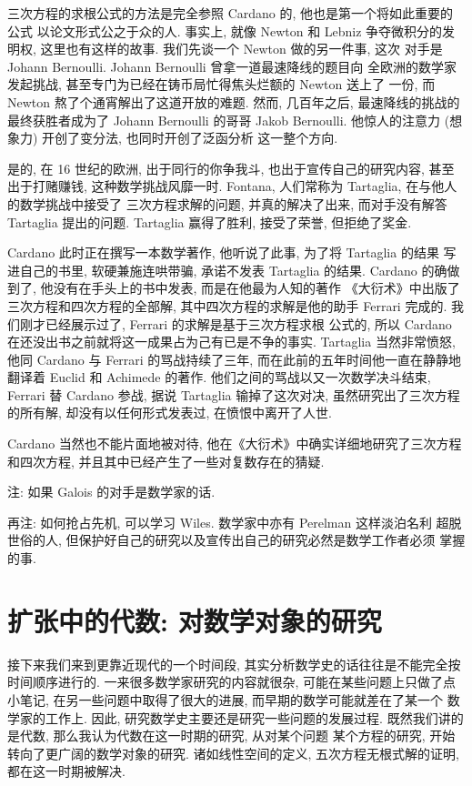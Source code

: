 \documentclass[UTF8]{book}
\begin{document}
三次方程的求根公式的方法是完全参照 Cardano 的, 他也是第一个将如此重要的公式
以论文形式公之于众的人. 事实上, 就像 Newton 和 Lebniz 争夺微积分的发明权, 
这里也有这样的故事. 
我们先谈一个 Newton 做的另一件事, 这次
对手是 Johann Bernoulli. Johann Bernoulli 曾拿一道最速降线的题目向
全欧洲的数学家发起挑战, 甚至专门为已经在铸币局忙得焦头烂额的 Newton 送上了
一份, 而 Newton 熬了个通宵解出了这道开放的难题. 
然而, 几百年之后, 最速降线的挑战的最终获胜者成为了 Johann Bernoulli 的哥哥 
Jakob Bernoulli. 他惊人的注意力 (想象力) 开创了变分法, 也同时开创了泛函分析
这一整个方向. 

是的, 在 16 世纪的欧洲, 出于同行的你争我斗, 也出于宣传自己的研究内容, 甚至
出于打赌赚钱, 这种数学挑战风靡一时. Fontana, 人们常称为 Tartaglia, 
在与他人的数学挑战中接受了
三次方程求解的问题, 并真的解决了出来, 而对手没有解答 Tartaglia 提出的问题. 
Tartaglia 赢得了胜利, 接受了荣誉, 但拒绝了奖金. 

Cardano 此时正在撰写一本数学著作, 他听说了此事, 为了将 Tartaglia 的结果
写进自己的书里, 软硬兼施连哄带骗, 承诺不发表 Tartaglia 的结果. 
Cardano 的确做到了, 他没有在手头上的书中发表, 而是在他最为人知的著作
《大衍术》中出版了三次方程和四次方程的全部解, 其中四次方程的求解是他的助手 
Ferrari 完成的. 我们刚才已经展示过了, Ferrari 的求解是基于三次方程求根
公式的, 所以 Cardano 在还没出书之前就将这一成果占为己有已是不争的事实. 
Tartaglia 当然非常愤怒, 他同 Cardano 与 Ferrari 的骂战持续了三年, 
而在此前的五年时间他一直在静静地翻译着 Euclid 和 Achimede 的著作. 
他们之间的骂战以又一次数学决斗结束, Ferrari 替 Cardano 参战, 
据说 Tartaglia 输掉了这次对决, 虽然研究出了三次方程的所有解, 
却没有以任何形式发表过, 在愤恨中离开了人世. 

Cardano 当然也不能片面地被对待, 他在《大衍术》中确实详细地研究了三次方程
和四次方程, 并且其中已经产生了一些对复数存在的猜疑. 

注: 如果 Galois 的对手是数学家的话. 

再注: 如何抢占先机, 可以学习 Wiles. 数学家中亦有 Perelman 这样淡泊名利
超脱世俗的人, 但保护好自己的研究以及宣传出自己的研究必然是数学工作者必须
掌握的事. 

\section{扩张中的代数: 对数学对象的研究}
接下来我们来到更靠近现代的一个时间段, 其实分析数学史的话往往是不能完全按
时间顺序进行的. 一来很多数学家研究的内容就很杂, 可能在某些问题上只做了点
小笔记, 在另一些问题中取得了很大的进展, 而早期的数学可能就差在了某一个
数学家的工作上. 因此, 研究数学史主要还是研究一些问题的发展过程. 
既然我们讲的是代数, 那么我认为代数在这一时期的研究, 从对某个问题
某个方程的研究, 开始转向了更广阔的数学对象的研究. 
诸如线性空间的定义, 五次方程无根式解的证明, 都在这一时期被解决.
\end{document}
